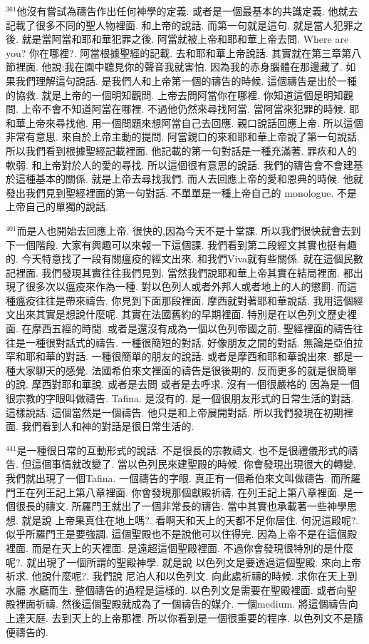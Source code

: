 \documentclass{book}
\begin{document}
$^{361}$他沒有嘗試為禱告作出任何神學的定義.
或者是一個最基本的共識定義.
他就去記載了很多不同的聖人物裡面.
和上帝的說話.
而第一句就是這句.
就是當人犯罪之後.
就是當阿當和耶和華犯罪之後.
阿當就被上帝和耶和華上帝去問.
Where are you? 你在哪裡?.
阿當根據聖經的記載.
去和耶和華上帝說話.
其實就在第三章第八節裡面.
他說:我在園中聽見你的聲音我就害怕.
因為我的赤身腦體在那邊藏了.
如果我們理解這句說話.
是我們人和上帝第一個的禱告的時候.
這個禱告是出於一種的協救.
就是上帝的一個明知觀問.
上帝去問阿當你在哪裡.
你知道這個是明知觀問.
上帝不會不知道阿當在哪裡.
不過他仍然來尋找阿當.
當阿當來犯罪的時候.
耶和華上帝來尋找他.
用一個問題來想阿當自己去回應.
親口說話回應上帝.
所以這個非常有意思.
來自於上帝主動的提問.
阿當親口的來和耶和華上帝說了第一句說話.
所以我們看到根據聖經記載裡面.
他記載的第一句對話是一種充滿著.
罪疚和人的軟弱.
和上帝對於人的愛的尋找.
所以這個很有意思的說話.
我們的禱告會不會建基於這種基本的關係.
就是上帝去尋找我們.
而人去回應上帝的愛和恩典的時候.
他就發出我們見到聖經裡面的第一句對話.
不單單是一種上帝自己的 monologue.
不是上帝自己的單獨的說話.

$^{401}$而是人也開始去回應上帝.
很快的,因為今天不是十堂課.
所以我們很快就會去到下一個階段.
大家有興趣可以來報一下這個課.
我們看到第二段經文其實也挺有趣的.
今天特意找了一段有關瘟疫的經文出來.
和我們Viva就有些關係.
就在這個民數記裡面.
我們發現其實往往我們見到.
當然我們說耶和華上帝其實在結局裡面.
都出現了很多次以瘟疫來作為一種.
對以色列人或者外邦人或者地上的人的懲罰.
而這種瘟疫往往是帶來禱告.
你見到下面那段裡面.
摩西就對著耶和華說話.
我用這個經文出來其實是想說什麼呢.
其實在法國舊約的早期裡面.
特別是在以色列文歷史裡面.
在摩西五經的時間.
或者是還沒有成為一個以色列帝國之前.
聖經裡面的禱告往往是一種很對話式的禱告.
一種很簡短的對話.
好像朋友之間的對話.
無論是亞伯拉罕和耶和華的對話.
一種很簡單的朋友的說話.
或者是摩西和耶和華說出來.
都是一種大家聊天的感覺.
法國希伯來文裡面的禱告是很後期的.
反而更多的就是很簡單的說.
摩西對耶和華說.
或者是去問 或者是去呼求.
沒有一個很嚴格的 因為是一個很宗教的字眼叫做禱告.
Tafina.
是沒有的.
是一個很朋友形式的日常生活的對話.
這樣說話.
這個當然是一個禱告.
他只是和上帝展開對話.
所以我們發現在初期裡面.
我們看到人和神的對話是很日常生活的.

$^{441}$是一種很日常的互動形式的說話.
不是很長的宗教禱文.
也不是很禮儀形式的禱告.
但這個事情就改變了.
當以色列民來建聖殿的時候.
你會發現出現很大的轉變.
我們就出現了一個Tafina.
一個禱告的字眼.
真正有一個希伯來文叫做禱告.
而所羅門王在列王記上第八章裡面.
你會發現那個獻殿祈禱.
在列王記上第八章裡面.
是一個很長的禱文.
所羅門王就出了一個非常長的禱告.
當中其實也承載著一些神學思想.
就是說 上帝果真住在地上嗎?.
看啊天和天上的天都不足你居住.
何況這殿呢?.
似乎所羅門王是要強調.
這個聖殿也不是說他可以住得完.
因為上帝不是在這個殿裡面.
而是在天上的天裡面.
是遠超這個聖殿裡面.
不過你會發現很特別的是什麼呢?.
就出現了一個所謂的聖殿神學.
就是說 以色列文是要透過這個聖殿.
來向上帝祈求.
他說什麼呢?.
我們說 尼泊人和以色列文.
向此處祈禱的時候.
求你在天上到水廳 水廳而生.
整個禱告的過程是這樣的.
以色列文是需要在聖殿裡面.
或者向聖殿裡面祈禱.
然後這個聖殿就成為了一個禱告的媒介.
一個medium.
將這個禱告向上達天庭.
去到天上的上帝那裡.
所以你看到是一個很重要的程序.
以色列文不是隨便禱告的.
\end{document}
